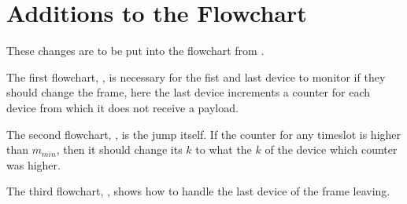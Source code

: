 \section{Additions to the Flowchart}
These changes are to be put into the flowchart from .

The first flowchart, , is necessary for the fist and last device to monitor if they should change the frame, here the last device increments a counter for each device from which it does not receive a payload.

The second flowchart, , is the jump itself.
If the counter for any timeslot is higher than $m_{min}$, then it should change its $k$ to what the $k$ of the device which counter was higher.

The third flowchart, , shows how to handle the last device of the frame leaving.
